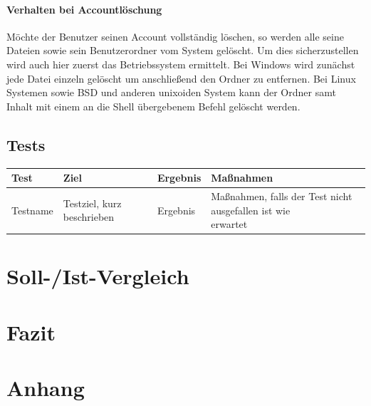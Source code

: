 \documentclass[10pt]{scrarticle}
\begin{document}
\paragraph{Verhalten bei Accountlöschung}
Möchte der Benutzer seinen Account vollständig löschen, so werden alle seine Dateien sowie sein Benutzerordner vom System gelöscht. Um dies sicherzustellen wird auch hier zuerst das Betriebssystem ermittelt. Bei Windows wird zunächst jede Datei einzeln gelöscht um anschließend den Ordner zu entfernen. Bei Linux Systemen sowie BSD und anderen unixoiden System kann der Ordner samt Inhalt mit einem an die Shell übergebenem Befehl gelöscht werden.

\subsection{Tests}

\begin{table}[ht!]
\begin{tabularx}{\textwidth}{l | l | l | l}

\textbf{Test}  & \textbf{Ziel}  & \textbf{Ergebnis} & \textbf{Maßnahmen}\\
\hline
Testname  & Testziel, kurz beschrieben  & Ergebnis & \makecell[l]{Maßnahmen, falls der Test nicht ausgefallen ist wie \\ erwartet}\\

\end{tabularx}
\end{table}

\section{Soll-/Ist-Vergleich}
\section{Fazit}
\section{Anhang}


\end{document}
